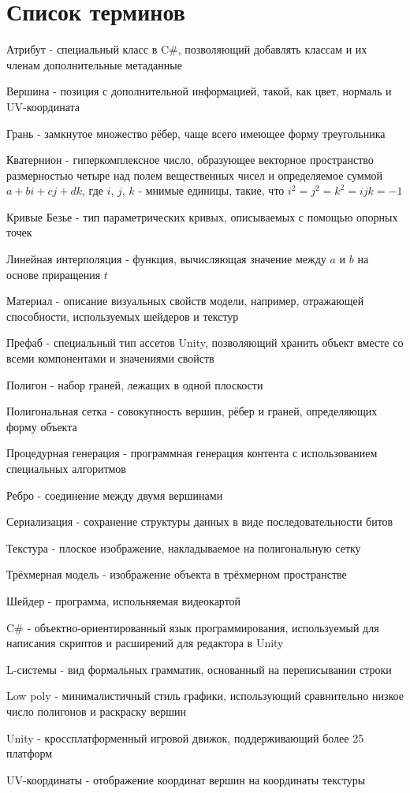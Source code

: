 \chapter{Список терминов}

\parindent=0cm

Атрибут - специальный класс в C\#, позволяющий добавлять классам и их членам дополнительные метаданные

Вершина - позиция с дополнительной информацией, такой, как цвет, нормаль и UV-координата

Грань - замкнутое множество рёбер, чаще всего имеющее форму треугольника

Кватернион - гиперкомплексное число, образующее векторное пространство размерностью четыре над полем вещественных чисел и определяемое суммой $a + bi + cj + dk$, где $i$, $j$, $k$ - мнимые единицы, такие, что $i^{2} = j^{2} = k^{2} = ijk = -1$

Кривые Безье - тип параметрических кривых, описываемых с помощью опорных точек

Линейная интерполяция - функция, вычисляющая значение между $a$ и $b$ на основе приращения $t$

Материал - описание визуальных свойств модели, например, отражающей способности, используемых шейдеров и текстур

Префаб - специальный тип ассетов Unity, позволяющий хранить объект вместе со всеми компонентами и значениями свойств

Полигон - набор граней, лежащих в одной плоскости

Полигональная сетка - совокупность вершин, рёбер и граней, определяющих форму объекта

Процедурная генерация - программная генерация контента с использованием специальных алгоритмов

Ребро - соединение между двумя вершинами

Сериализация - сохранение структуры данных в виде последовательности битов

Текстура - плоское изображение, накладываемое на полигональную сетку

Трёхмерная модель - изображение объекта в трёхмерном пространстве

Шейдер - программа, испольняемая видеокартой

C\# - объектно-ориентированный язык программирования, используемый для написания скриптов и расширений для редактора в Unity

L-системы - вид формальных грамматик, основанный на переписывании строки

Low poly - минималистичный стиль графики, использующий сравнительно низкое число полигонов и раскраску вершин

Unity - кроссплатформенный игровой движок, поддерживающий более 25 платформ

UV-координаты - отображение координат вершин на координаты текстуры

\parindent=1.25cm
